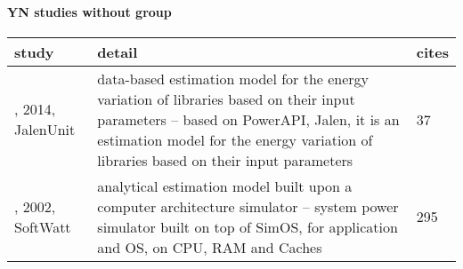 \paragraph{YN studies without group} 
 \label{tab:YN-other} 
\begin{longtable}{|>{\raggedright\arraybackslash}p{2.75cm}|p{11.75cm}|p{0.7cm}|}
\toprule
\bfseries study & \bfseries detail & \bfseries cites \\
\midrule 
\endhead
\cite{noureddine2014}, 2014, JalenUnit & data-based estimation model for the energy variation of libraries based on their input parameters -- based on PowerAPI, Jalen, it is an estimation model for the energy variation of libraries based on their input parameters & 37 \\
\cite{gurumurthi2002}, 2002, SoftWatt & analytical estimation model built upon a computer architecture simulator -- system power simulator built on top of SimOS, for application and OS, on CPU, RAM and Caches & 295 \\
\bottomrule
\end{longtable}
